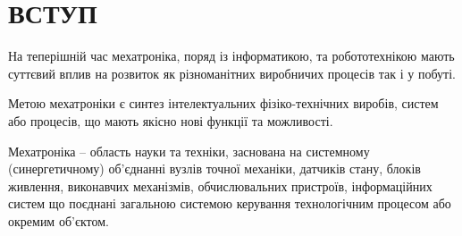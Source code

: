 \section*{\centering ВСТУП}

На теперішній час мехатроніка, поряд із інформатикою, та робототехнікою мають суттєвий вплив на розвиток як різноманітних виробничих процесів так і у побуті.

Метою мехатроніки є синтез інтелектуальних фізіко-технічних виробів, систем або процесів, що мають якісно нові функції та можливості.

Мехатроніка -- область науки та техніки, заснована на системному (синергетичному) об'єднанні вузлів точної механіки, датчиків стану, блоків живлення, виконавчих механізмів, обчислювальних пристроїв, інформаційних систем що поєднані загальною системою керування технологічним процесом або окремим об'єктом.